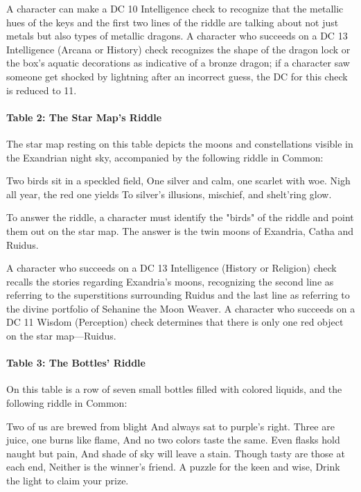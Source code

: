 \documentclass[a4paper, 11pt, bg=full, twocolumn, nooutline]{dndbook}
\begin{document}
A character can make a DC 10 Intelligence check to recognize that the metallic hues of the keys and the first two lines of the riddle are talking about not just metals but also types of metallic dragons. A character who succeeds on a DC 13 Intelligence (Arcana or History) check recognizes the shape of the dragon lock or the box's aquatic decorations as indicative of a bronze dragon; if a character saw someone get shocked by lightning after an incorrect guess, the DC for this check is reduced to 11.

\paragraph{Table 2: The Star Map's Riddle}

The star map resting on this table depicts the moons and constellations visible in the Exandrian night sky, accompanied by the following riddle in Common:

\begin{DndReadAloud}
Two birds sit in a speckled field, One silver and calm, one scarlet with woe. Nigh all year, the red one yields To silver's illusions, mischief, and shelt'ring glow.
\end{DndReadAloud}

To answer the riddle, a character must identify the "birds" of the riddle and point them out on the star map. The answer is the twin moons of Exandria, Catha and Ruidus.

A character who succeeds on a DC 13 Intelligence (History or Religion) check recalls the stories regarding Exandria's moons, recognizing the second line as referring to the superstitions surrounding Ruidus and the last line as referring to the divine portfolio of Sehanine the Moon Weaver. A character who succeeds on a DC 11 Wisdom (Perception) check determines that there is only one red object on the star map---Ruidus.

\paragraph{Table 3: The Bottles' Riddle}

On this table is a row of seven small bottles filled with colored liquids, and the following riddle in Common:

\begin{DndReadAloud}
Two of us are brewed from blight And always sat to purple's right. Three are juice, one burns like flame, And no two colors taste the same. Even flasks hold naught but pain, And shade of sky will leave a stain. Though tasty are those at each end, Neither is the winner's friend. A puzzle for the keen and wise, Drink the light to claim your prize.
\end{DndReadAloud}
\end{document}
